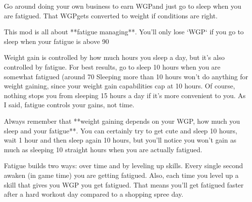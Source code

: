 \documentclass[11pt]{article}
\newcommand{\W}{WGP}
\begin{document}
Go around doing your own business to earn \W and just go to sleep when you are fatigued. That \W gets converted to weight if conditions are right.



This mod is all about **fatigue managing**.
You'll only lose `WGP` if you go to sleep when your fatigue is above 90%

Weight gain is controlled by how much hours you sleep a day, but it's also controlled by fatigue. For best results, go to sleep 10 hours when you are somewhat fatigued (around 70%
Sleeping more than 10 hours won't do anything for weight gaining, since your weight gain capabilities cap at 10 hours.
Of course, nothing stops you from sleeping 15 hours a day if it's more convenient to you. As I said, fatigue controls your gains, not time.

Always remember that **weight gaining depends on your WGP, how much you sleep and your fatigue**. You can certainly try to get cute and sleep 10 hours, wait 1 hour and then sleep again 10 hours, but you'll notice you won't gain as much as sleeping 10 straight hours when you are actually fatigued.

Fatigue builds two ways: over time and by leveling up skills.
Every single second awaken (in game time) you are getting fatigued. Also, each time you level up a skill that gives you WGP you get fatigued.
That means you'll get fatigued faster after a hard workout day compared to a shopping spree day.
\end{document}
